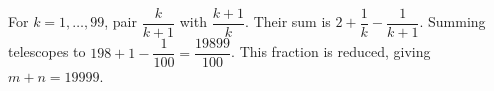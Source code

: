 For $k=1,\ldots,99$, pair $\dfrac{k}{k+1}$ with $\dfrac{k+1}{k}$. Their sum is $2+\dfrac{1}{k}-\dfrac{1}{k+1}$. Summing telescopes to $198+1-\dfrac{1}{100}=\dfrac{19899}{100}$. This fraction is reduced, giving $\boxed{m+n=19999}$.
